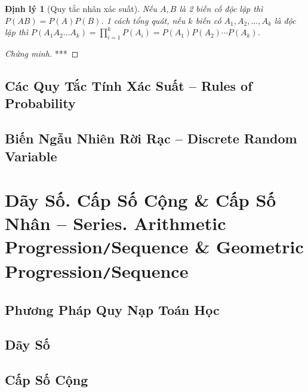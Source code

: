 \documentclass[oneside]{book}
\numberwithin{equation}{section}
\newtheorem{dinhly}{Định lý}[section]
\begin{document}
\begin{dinhly}[Quy tắc nhân xác suất]
	Nếu $A,B$ là 2 biến cố độc lập thì $P(AB) = P(A)P(B)$. 1 cách tổng quát, nếu $k$ biến cố $A_1,A_2,\ldots,A_k$ là độc lập thì $P(A_1A_2\ldots A_k) = \prod_{i=1}^k P(A_i) = P(A_1)P(A_2)\cdots P(A_k)$.
\end{dinhly}

\begin{proof}[Chứng minh]
	***
\end{proof}



\section{Các Quy Tắc Tính Xác Suất -- Rules of Probability}


\section{Biến Ngẫu Nhiên Rời Rạc -- Discrete Random Variable}


\chapter{Dãy Số. Cấp Số Cộng \& Cấp Số Nhân -- Series. Arithmetic Progression\texttt{/}Sequence \& Geometric Progression\texttt{/}Sequence}

\section{Phương Pháp Quy Nạp Toán Học}


\section{Dãy Số}


\section{Cấp Số Cộng}
\end{document}
